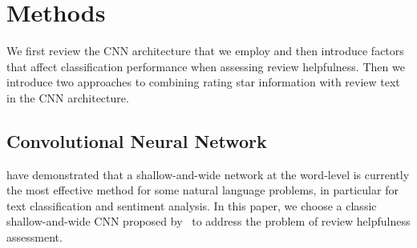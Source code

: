 \documentclass[conference,compsoc]{IEEEtran}
\begin{document}
\section{Methods}\label{sec:model}%

We first review the CNN architecture that we employ and then introduce factors that affect classification performance when assessing review helpfulness. Then we introduce two approaches to combining rating star information with review text in the CNN architecture.

\subsection{Convolutional Neural Network}\cite{Hoa_2017} have demonstrated that a shallow-and-wide network at the word-level is currently the most effective method for some natural language problems, in particular for text classification and sentiment analysis. In this paper, we choose a classic shallow-and-wide CNN proposed by~\cite{Kim14f} to address the problem of review helpfulness assessment. 
\end{document}
